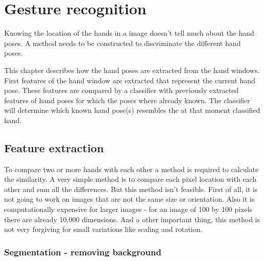 
\chapter{Gesture recognition}
\label{ch:gestures}

Knowing the location of the hands in a image doesn't tell much about the hand poses. A method needs to be constructed to discriminate the different hand poses.

This chapter describes how the hand poses are extracted from the hand windows. First features of the hand window are extracted that represent the current hand pose. These features are compared by a classifier with previously extracted features of hand poses for which the poses where already known. The classifier will determine which known hand pose(s) resembles the at that moment classified hand.


\section{Feature extraction}
To compare two or more hands with each other a method is required to calculate the similarity. A very simple method is to compare each pixel location with each other and sum all the differences. But this method isn't feasible. First of all, it is not going to work on images that are not the same size or orientation. Also it is computationally expensive for larger images - for an image of 100 by 100 pixels there are already 10.000 dimensions. And a other important thing, this method is not very forgiving for small variations like scaling and rotation.


\subsection*{Segmentation - removing background}

